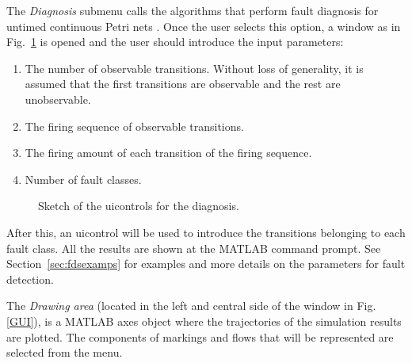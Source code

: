 The \emph{Diagnosis} submenu calls the algorithms that perform fault diagnosis for untimed continuous Petri nets \cite{ARMASECASI12}. Once the user selects this option, a window as in Fig.~\ref{fig:diag} is opened and the user should introduce the input parameters:
\begin{enumerate}
\item The number of observable transitions. Without loss of generality, it is assumed that the first transitions are observable and the rest are unobservable.
\item The firing sequence of observable transitions.
\item The firing amount of each transition of the firing sequence.
\item Number of fault classes.
\end{enumerate}


\begin{figure}[!htb]
   \caption[htb!]{Sketch of the uicontrols for the diagnosis.}\label{fig:diag}
\end{figure}

After this, an uicontrol will be used to introduce the transitions belonging to each fault class. All the results are shown at the MATLAB command prompt. See Section~\ref{sec:fdsexamps} for examples and more details on the parameters for fault detection.


The \emph{Drawing area} (located in the left and central side of the window in Fig. \ref{GUI}), is a MATLAB axes object where the trajectories of the simulation results are plotted. The components of markings and flows that will be represented are selected from the menu.

